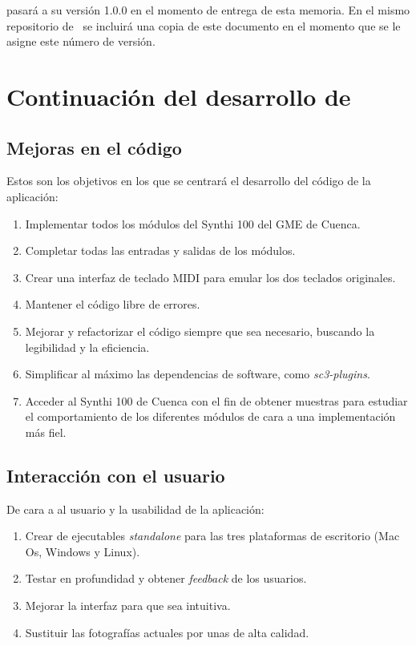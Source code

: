 \appName pasará a su versión 1.0.0 en el momento de entrega de esta memoria. En el mismo repositorio de \appName~se incluirá una copia de este documento en el momento que se le asigne este número de versión.


\section{Continuación del desarrollo de \appName}


\subsection{Mejoras en el código}
Estos son los objetivos en los que se centrará el desarrollo del código de la aplicación:

\begin{enumerate}
	\item Implementar todos los módulos del Synthi 100 del GME de Cuenca.
	\item Completar todas las entradas y salidas de los módulos.
	\item Crear una interfaz de teclado MIDI para emular los dos teclados originales.
	\item Mantener el código libre de errores.
	\item Mejorar y refactorizar el código siempre que sea necesario, buscando la legibilidad y la eficiencia.
	\item Simplificar al máximo las dependencias de software, como \textit{sc3-plugins}.
	\item Acceder al Synthi 100 de Cuenca con el fin de obtener muestras para estudiar el comportamiento de los diferentes módulos de cara a una implementación más fiel.
\end{enumerate}


\subsection{Interacción con el usuario}
De cara a al usuario y la usabilidad de la aplicación:

\begin{enumerate}
	\item Crear de ejecutables \textit{standalone} para las tres plataformas de escritorio (Mac Os, Windows y Linux).
	\item Testar en profundidad y obtener \textit{feedback} de los usuarios.
	\item Mejorar la interfaz para que sea intuitiva.
	\item Sustituir las fotografías actuales por unas de alta calidad.	
\end{enumerate}


